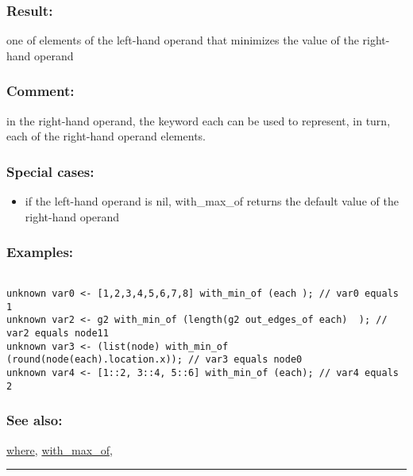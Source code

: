 \documentclass[]{book}
\providecommand{\tightlist}{%
  \setlength{\itemsep}{0pt}\setlength{\parskip}{0pt}}
\theoremstyle{definition}
\theoremstyle{definition}
\theoremstyle{definition}
\theoremstyle{remark}
\begin{document}
\subsubsection{Result:}\label{result-537}

one of elements of the left-hand operand that minimizes the value of the
right-hand operand

\subsubsection{Comment:}\label{comment-110}

in the right-hand operand, the keyword each can be used to represent, in
turn, each of the right-hand operand elements.

\subsubsection{Special cases:}\label{special-cases-148}

\begin{itemize}
\tightlist
\item
  if the left-hand operand is nil, with\_max\_of returns the default
  value of the right-hand operand
\end{itemize}

\subsubsection{Examples:}\label{examples-385}

\begin{verbatim}
 
unknown var0 <- [1,2,3,4,5,6,7,8] with_min_of (each ); // var0 equals 1 
unknown var2 <- g2 with_min_of (length(g2 out_edges_of each)  ); // var2 equals node11 
unknown var3 <- (list(node) with_min_of (round(node(each).location.x)); // var3 equals node0 
unknown var4 <- [1::2, 3::4, 5::6] with_min_of (each); // var4 equals 2
\end{verbatim}

\subsubsection{See also:}\label{see-also-222}

\href{OperatorsSZ\#where}{where},
\href{OperatorsSZ\#with_max_of}{with\_max\_of},

\begin{center}\rule{0.5\linewidth}{\linethickness}\end{center}
\end{document}
